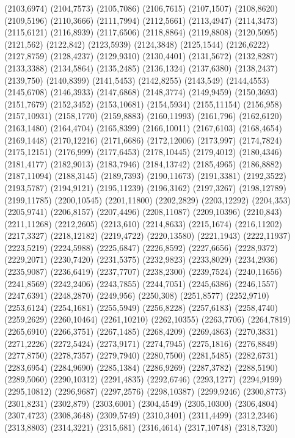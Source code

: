 (2103,6974)
(2104,7573)
(2105,7086)
(2106,7615)
(2107,1507)
(2108,8620)
(2109,5196)
(2110,3666)
(2111,7994)
(2112,5661)
(2113,4947)
(2114,3473)
(2115,6121)
(2116,8939)
(2117,6506)
(2118,8864)
(2119,8808)
(2120,5095)
(2121,562)
(2122,842)
(2123,5939)
(2124,3848)
(2125,1544)
(2126,6222)
(2127,8759)
(2128,4237)
(2129,9310)
(2130,4401)
(2131,5672)
(2132,8287)
(2133,3388)
(2134,5864)
(2135,2485)
(2136,1324)
(2137,6380)
(2138,2437)
(2139,750)
(2140,8399)
(2141,5453)
(2142,8255)
(2143,549)
(2144,4553)
(2145,6708)
(2146,3933)
(2147,6868)
(2148,3774)
(2149,9459)
(2150,3693)
(2151,7679)
(2152,3452)
(2153,10681)
(2154,5934)
(2155,11154)
(2156,958)
(2157,10931)
(2158,1770)
(2159,8883)
(2160,11993)
(2161,796)
(2162,6120)
(2163,1480)
(2164,4704)
(2165,8399)
(2166,10011)
(2167,6103)
(2168,4654)
(2169,1448)
(2170,12216)
(2171,6686)
(2172,12006)
(2173,997)
(2174,7824)
(2175,12151)
(2176,999)
(2177,6453)
(2178,10445)
(2179,4012)
(2180,4346)
(2181,4177)
(2182,9013)
(2183,7946)
(2184,13742)
(2185,4965)
(2186,8882)
(2187,11094)
(2188,3145)
(2189,7393)
(2190,11673)
(2191,3381)
(2192,3522)
(2193,5787)
(2194,9121)
(2195,11239)
(2196,3162)
(2197,3267)
(2198,12789)
(2199,11785)
(2200,10545)
(2201,11800)
(2202,2829)
(2203,12292)
(2204,353)
(2205,9741)
(2206,8157)
(2207,4496)
(2208,11087)
(2209,10396)
(2210,843)
(2211,11268)
(2212,2605)
(2213,610)
(2214,8633)
(2215,1674)
(2216,11202)
(2217,3327)
(2218,12182)
(2219,4722)
(2220,13580)
(2221,1943)
(2222,11937)
(2223,5219)
(2224,5988)
(2225,6847)
(2226,8592)
(2227,6656)
(2228,9372)
(2229,2071)
(2230,7420)
(2231,5375)
(2232,9823)
(2233,8029)
(2234,2936)
(2235,9087)
(2236,6419)
(2237,7707)
(2238,2300)
(2239,7524)
(2240,11656)
(2241,8569)
(2242,2406)
(2243,7855)
(2244,7051)
(2245,6386)
(2246,1557)
(2247,6391)
(2248,2870)
(2249,956)
(2250,308)
(2251,8577)
(2252,9710)
(2253,6124)
(2254,1681)
(2255,5949)
(2256,8228)
(2257,6183)
(2258,4740)
(2259,2629)
(2260,10464)
(2261,10210)
(2262,10355)
(2263,7706)
(2264,7819)
(2265,6910)
(2266,3751)
(2267,1485)
(2268,4209)
(2269,4863)
(2270,3831)
(2271,2226)
(2272,5424)
(2273,9171)
(2274,7945)
(2275,1816)
(2276,8849)
(2277,8750)
(2278,7357)
(2279,7940)
(2280,7500)
(2281,5485)
(2282,6731)
(2283,6954)
(2284,9690)
(2285,1384)
(2286,9269)
(2287,3782)
(2288,5190)
(2289,5060)
(2290,10312)
(2291,4835)
(2292,6746)
(2293,1277)
(2294,9199)
(2295,10812)
(2296,9687)
(2297,2576)
(2298,10387)
(2299,9246)
(2300,8773)
(2301,8231)
(2302,879)
(2303,6001)
(2304,4549)
(2305,10300)
(2306,4804)
(2307,4723)
(2308,3648)
(2309,5749)
(2310,3401)
(2311,4499)
(2312,2346)
(2313,8803)
(2314,3221)
(2315,681)
(2316,4614)
(2317,10748)
(2318,7320)
